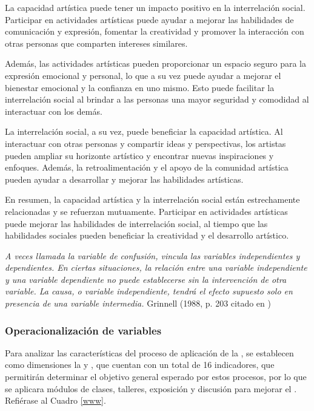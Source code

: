 \documentclass[12pt,a4paper]{article}
\begin{document}
\begin{itemize}
	      La capacidad artística puede tener un impacto positivo en la interrelación social. Participar en actividades artísticas puede ayudar a mejorar las habilidades de comunicación y expresión, fomentar la creatividad y promover la interacción con otras personas que comparten intereses similares.

	      Además, las actividades artísticas pueden proporcionar un espacio seguro para la expresión emocional y personal, lo que a su vez puede ayudar a mejorar el bienestar emocional y la confianza en uno mismo. Esto puede facilitar la interrelación social al brindar a las personas una mayor seguridad y comodidad al interactuar con los demás.

	      La interrelación social, a su vez, puede beneficiar la capacidad artística. Al interactuar con otras personas y compartir ideas y perspectivas, los artistas pueden ampliar su horizonte artístico y encontrar nuevas inspiraciones y enfoques. Además, la retroalimentación y el apoyo de la comunidad artística pueden ayudar a desarrollar y mejorar las habilidades artísticas.

	      En resumen, la capacidad artística y la interrelación social están estrechamente relacionadas y se refuerzan mutuamente. Participar en actividades artísticas puede mejorar las habilidades de interrelación social, al tiempo que las habilidades sociales pueden beneficiar la creatividad y el desarrollo artístico.


	      \begin{displayquote}
		      \emph{A veces llamada la variable de confusión, vincula las variables independientes y dependientes. En ciertas situaciones, la relación entre una variable independiente y una variable dependiente no puede establecerse sin la intervención de otra variable. La causa, o variable independiente, tendrá el efecto supuesto solo en presencia de una variable intermedia.} Grinnell (1988, p. 203 citado en \cite{kothari_research_2004})
	      \end{displayquote}
\end{itemize}

\subsubsection{Operacionalización de variables}
\textbf{\variablei}
Para analizar las características del proceso de aplicación de la \MakeTextLowercase{\variablei}, se establecen como dimensiones la \MakeTextLowercase{\dimi} \MakeTextLowercase{\dimii} \MakeTextLowercase{\dimiii} y \MakeTextLowercase{\dimiiii}, que cuentan con un total de 16 indicadores, que permitirán determinar el objetivo general esperado por estos procesos, por lo que se aplicara módulos de clases, talleres, exposición y discusión para mejorar el \MakeTextLowercase{\variabled}. Refiérase al Cuadro \ref{www}.
\end{document}
